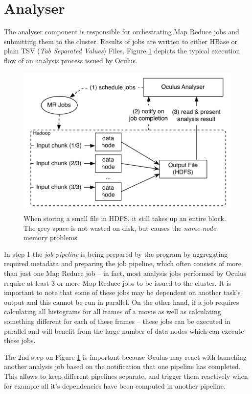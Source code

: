 \section{Analyser}
\label{sec:analyser}
The analyser component is responsible for orchestrating Map Reduce jobs and submitting them to the cluster. Results of jobs are written to either HBase or plain TSV (\textit{Tab Separated Values}) Files. Figure \ref{fig:analyser-high-level} depicts the typical execution flow of an analysis process issued by Oculus.

\begin{figure}[ch!]
  \centering
  \includegraphics[scale=0.9]{diagrams/analyser-high-level.pdf}
  \caption{When storing a small file in HDFS, it still takes up an entire block. The grey space is not wasted on disk, but causes the \textit{name-node} memory problems.}
  \label{fig:analyser-high-level}
\end{figure}

In step 1 the \textit{job pipeline} is being prepared by the program by aggregating required metadata and preparing the job pipeline, which often consists of more than just one Map Reduce job -- in fact, most analysis jobs performed by Oculus require at least 3 or more Map Reduce jobs to be issued to the cluster. It is important to note that some of these jobs may be dependent on another task's output and this cannot be run in parallel. On the other hand, if a job requires calculating all histograms for all frames of a movie as well as calculating something different for each of these frames -- these jobs can be executed in parallel and will benefit from the large number of data nodes which can execute these jobs.

The 2nd step on Figure \ref{fig:analyser-high-level} is important because Oculus may react with launching another analysis job based on the notification that one pipeline has completed. This allows to keep different pipelines separate, and trigger them reactively when for example all it's dependencies have been computed in another pipeline.

